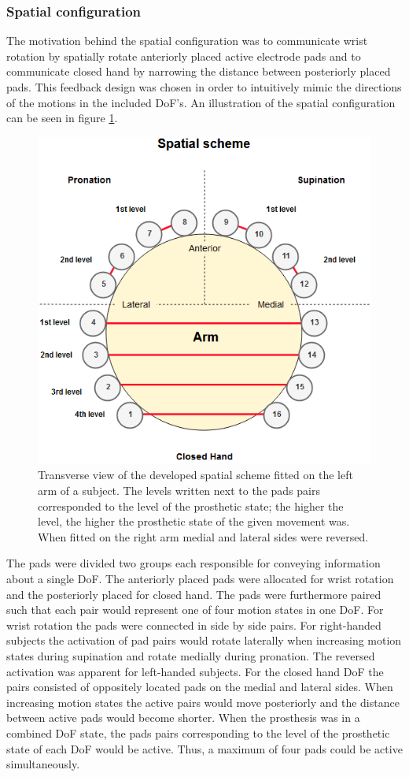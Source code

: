 \subsubsection{Spatial configuration}
The motivation behind the spatial configuration was to communicate wrist rotation by spatially rotate anteriorly placed active electrode pads and to communicate closed hand by narrowing the distance between posteriorly placed pads. 
This feedback design was chosen in order to intuitively mimic the directions of the motions in the included DoF's. An illustration of the spatial configuration can be seen in figure \ref{fig:pa:spatial}. 

\begin{figure}[h]                 
	\includegraphics[width=.9\textwidth]{figures/El_array_spatial}  
	\caption{Transverse view of the developed spatial scheme fitted on the left arm of a subject. The levels written next to the pads pairs corresponded to the level of the prosthetic state; the higher the level, the higher the prosthetic state of the given movement was. When fitted on the right arm medial and lateral sides were reversed.}
	\label{fig:pa:spatial} 
\end{figure}
The pads were divided two groups each responsible for conveying information about a single DoF. The anteriorly placed pads were allocated for wrist rotation and the posteriorly placed for closed hand. The pads were furthermore paired such that each pair would represent one of four motion states in one DoF. For wrist rotation the pads were connected in side by side pairs. For right-handed subjects the activation of pad pairs would rotate laterally when increasing motion states during supination and rotate medially during pronation. The reversed activation was apparent for left-handed subjects. For the closed hand DoF the pairs consisted of oppositely located pads on the medial and lateral sides. When increasing motion states the active pairs would move posteriorly and the distance between active pads would become shorter. When the prosthesis was in a combined DoF state, the pads pairs corresponding to the level of the prosthetic state of each DoF would be active. Thus, a maximum of four pads could be active simultaneously. 

